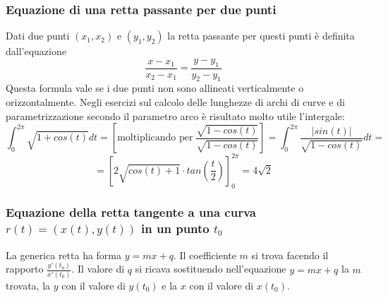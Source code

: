 \subsubsection{Equazione di una retta passante per due punti}
Dati due punti $(x_1, x_2)$ e $(y_1, y_2)$ la retta passante per questi punti è definita dall'equazione
\[
    \frac{x-x_1}{x_2-x_1} = \frac{y-y_1}{y_2-y_1}
\]
Questa formula vale se i due punti non sono allineati verticalmente o orizzontalmente.\newline
\newline
Negli esercizi sul calcolo delle lunghezze di archi di curve e di parametrizzazione secondo il parametro arco è risultato molto utile l'intergale:
\[
    \int_{0}^{2\pi} \sqrt{1 + cos(t)}dt = \left[\text{moltiplicando per} \; \frac{\sqrt{1-cos(t)}}{\sqrt{1-cos(t)}}\right] = \int_{0}^{2\pi}\frac{|sin(t)|}{\sqrt{1-cos(t)}}dt =
\]
\[
    = [2 \sqrt{cos(t) +1}\cdot  tan(\frac{t}{2}) ]_0^{2\pi} = 4 \sqrt{2}
\]
\subsubsection{Equazione della retta tangente a una curva $r(t) = (x(t), y(t))$ in un punto $t_0$}
La generica retta ha forma $y = mx +q$. \newline
Il coefficiente $m$ si trova facendo il rapporto $\frac{y'(t_0)}{x'(t_0)}$.\newline
Il valore di $q$ si ricava sostituendo nell'equazione $y = mx +q$ la $m$ trovata, la $y$ con il valore di $y(t_0)$ e la $x$ con il valore di $x(t_0)$.